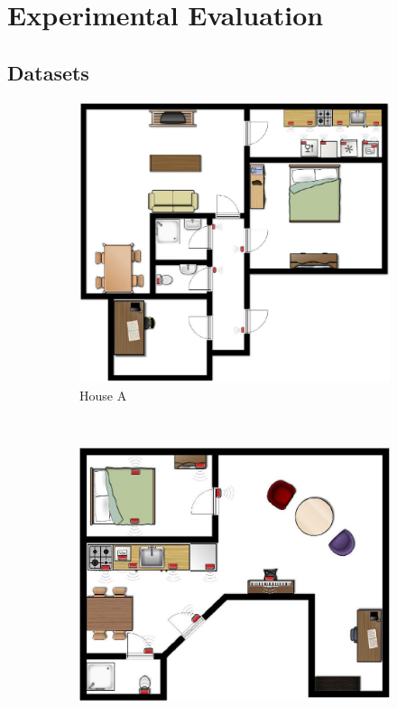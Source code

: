 \section{Experimental Evaluation}

\subsection{Datasets}

\begin{figure}
	\centering
	\begin{subfigure}[b]{0.35\textwidth}
		\includegraphics[width=\textwidth]{fig/houseA.png}
		\caption{House A}
		\label{fig:houseA}
	\end{subfigure}
	~
	\begin{subfigure}[b]{0.35\textwidth}
		\includegraphics[width=\textwidth]{fig/houseB.png}

\end{subfigure}
\end{figure}
